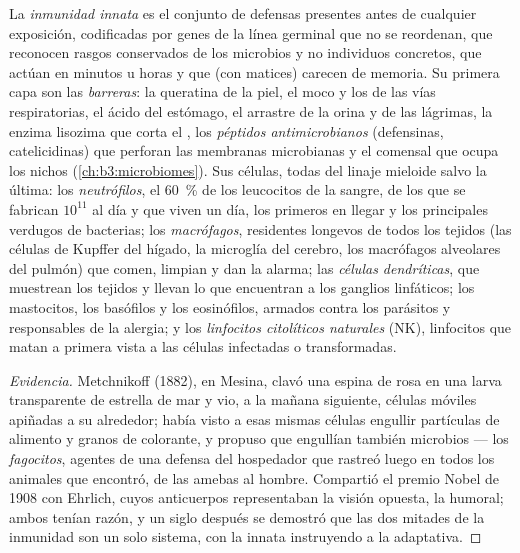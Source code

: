 \begin{definition}\label{def:b3:innate-immunity:innate}
La \emph{inmunidad innata} es el conjunto de defensas presentes antes de
cualquier exposición, codificadas por genes de la línea germinal que no
se reordenan, que reconocen rasgos conservados de los microbios y no
individuos concretos, que actúan en minutos u horas y que (con matices)
carecen de memoria. Su primera capa son las \emph{barreras}: la queratina
de la piel, el moco y los  de las vías respiratorias, el ácido del
estómago, el arrastre de la orina y de las lágrimas, la enzima lisozima
que corta el , los \emph{péptidos antimicrobianos}
(defensinas, catelicidinas) que perforan las membranas microbianas y el
 comensal que ocupa los nichos (\cref{ch:b3:microbiomes}). Sus
células, todas del linaje mieloide salvo la última: los
\emph{neutrófilos}, el \qty{60}{\%} de los leucocitos de la sangre, de
los que se fabrican $10^{11}$ al día y que viven un día, los primeros en
llegar y los principales verdugos de bacterias; los \emph{macrófagos},
residentes longevos de todos los tejidos (las células de Kupffer del
hígado, la microglía del cerebro, los macrófagos alveolares del pulmón)
que comen, limpian y dan la alarma; las \emph{células dendríticas}, que
muestrean los tejidos y llevan lo que encuentran a los ganglios
linfáticos; los mastocitos, los basófilos y los eosinófilos, armados
contra los parásitos y responsables de la alergia; y los
\emph{linfocitos citolíticos naturales} (NK), linfocitos que matan a
primera vista a las células infectadas o transformadas.
\end{definition}

\begin{proof}[Evidencia]
Metchnikoff (1882), en Mesina, clavó una espina de rosa en una larva
transparente de estrella de mar y vio, a la mañana siguiente, células
móviles apiñadas a su alrededor; había visto a esas mismas células
engullir partículas de alimento y granos de colorante, y propuso que
engullían también microbios --- los \emph{fagocitos}, agentes de una
defensa del hospedador que rastreó luego en todos los animales que
encontró, de las amebas al hombre. Compartió el premio Nobel de 1908 con
Ehrlich, cuyos anticuerpos representaban la visión opuesta, la humoral;
ambos tenían razón, y un siglo después se demostró que las dos mitades de
la inmunidad son un solo sistema, con la innata instruyendo a la
adaptativa.
\end{proof}

